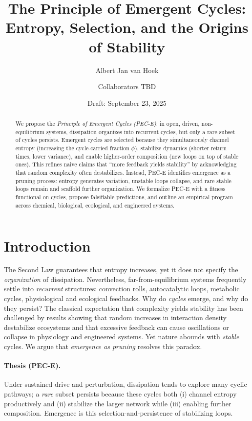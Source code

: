 \documentclass[11pt,a4paper]{article}
\title{The Principle of Emergent Cycles: Entropy, Selection, and the Origins of Stability}
\author[1]{Albert Jan van Hoek}
\author[2]{\small Collaborators TBD}
\affil[1]{\small Public Health Sciences, Hilversum, NL}
\affil[2]{\small Institution(s) TBD}
\date{Draft: September 23, 2025}
\newcommand{\phifrac}{\phi}
\begin{document}
\maketitle

\begin{abstract}
We propose the \emph{Principle of Emergent Cycles (PEC-E)}: in open, driven, non-equilibrium systems, dissipation organizes into recurrent cycles, but only a rare subset of cycles persists. Emergent cycles are selected because they simultaneously channel entropy (increasing the cycle-carried fraction \(\phifrac\)), stabilize dynamics (shorter return times, lower variance), and enable higher-order composition (new loops on top of stable ones). This refines naive claims that ``more feedback yields stability'' by acknowledging that random complexity often destabilizes. Instead, PEC-E identifies emergence as a pruning process: entropy generates variation, unstable loops collapse, and rare stable loops remain and scaffold further organization. We formalize PEC-E with a fitness functional on cycles, propose falsifiable predictions, and outline an empirical program across chemical, biological, ecological, and engineered systems.
\end{abstract}

\section{Introduction}
The Second Law guarantees that entropy increases, yet it does not specify the \emph{organization} of dissipation. Nevertheless, far-from-equilibrium systems frequently settle into \emph{recurrent} structures: convection rolls, autocatalytic loops, metabolic cycles, physiological and ecological feedbacks. Why do \emph{cycles} emerge, and why do they persist? The classical expectation that complexity yields stability has been challenged by results showing that random increases in interaction density destabilize ecosystems and that excessive feedback can cause oscillations or collapse in physiology and engineered systems. Yet nature abounds with \emph{stable} cycles. We argue that \emph{emergence as pruning} resolves this paradox.

\paragraph{Thesis (PEC-E).} Under sustained drive and perturbation, dissipation tends to explore many cyclic pathways; a \emph{rare} subset persists because these cycles both (i) channel entropy productively and (ii) stabilize the larger network while (iii) enabling further composition. Emergence is this selection-and-persistence of stabilizing loops.
\end{document}
